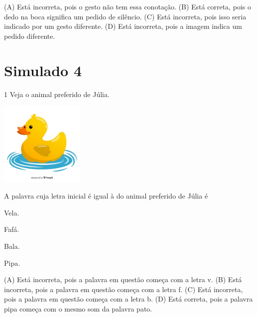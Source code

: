(A) Está incorreta, pois o gesto não tem essa conotação.
(B) Está correta, pois o dedo na boca significa um pedido de silêncio.
(C) Está incorreta, pois isso seria indicado por um gesto diferente.
(D) Está incorreta, pois a imagem indica um pedido diferente.

\chapter{Simulado 4}

\num{1} Veja o animal preferido de Júlia.

\includegraphics[width=1.58974in,height=1.58974in]{media/image174.jpeg}


A palavra cuja letra inicial é igual à do animal preferido de Júlia é

\begin{minipage}{.5\textwidth}
\begin{escolha}
\item Vela.

\item Fafá.

\item Bala.

\item Pipa.
\end{escolha}
\end{minipage}

(A) Está incorreta, pois a palavra em questão começa com a letra v.
(B) Está incorreta, pois a palavra em questão começa com a letra f.
(C) Está incorreta, pois a palavra em questão começa com a letra b.
(D) Está correta, pois a palavra pipa começa com o mesmo som da palavra pato.

